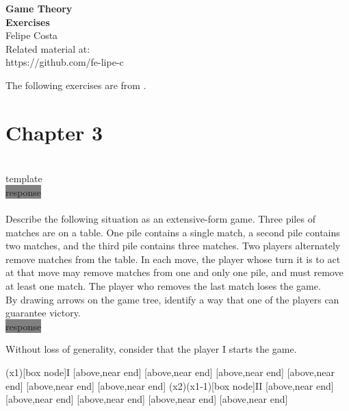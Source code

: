\documentclass[12pt]{article}
\newcommand{\DOI}{https://github.com/fe-lipe-c}
\begin{document}
\begin{titlepage}
	\begin{flushright}
		\LARGE{\textbf{Game Theory}}\\
		\vfill
		\Huge{\textbf{Exercises}}\\
		\vfill
		\large Felipe Costa\\
		\vfill
		\normalsize Related material at:\\
		\DOI
		\vfill
	\end{flushright}
\end{titlepage}

\begin{center}
	\tableofcontents
\end{center}

\pagebreak

The following exercises are from \cite{maschler_solan_zamir_2020}.

\section{Chapter 3}

\\
template\\
\colorbox{gray}{response}
\vspace{0.5cm}\\
\\
Describe the following situation as an extensive-form game. Three piles of matches are on a table. One pile contains a single match, a second pile contains two matches, and the third pile contains three matches. Two players alternately remove matches from the table. In each move, the player whose turn it is to act at that move may remove matches from one and only one pile, and must remove at least one match. The player who removes the last match loses the game.\\
By drawing arrows on the game tree, identify a way that one of the players can guarantee victory.\\
\colorbox{gray}{response}
\vspace{0.5cm}

Without loss of generality, consider that the player I starts the game.

\vspace{0.5cm}
\begin{istgame}[sloped, above right,font=\tiny]
	\xtdistance{32mm}{15mm}
	\istrooto(x1)[box node]{I}
	[above,near end]
	[above,near end]
	[above,near end]
	[above,near end]
	[above,near end]
	[above,near end]
	\endist
	\istrooto(x2)(x1-1)[box node]{II}
	[above,near end]
	[above,near end]
	[above,near end]
	[above,near end]
	[above,near end]
	\endist
\end{istgame}
\end{document}

